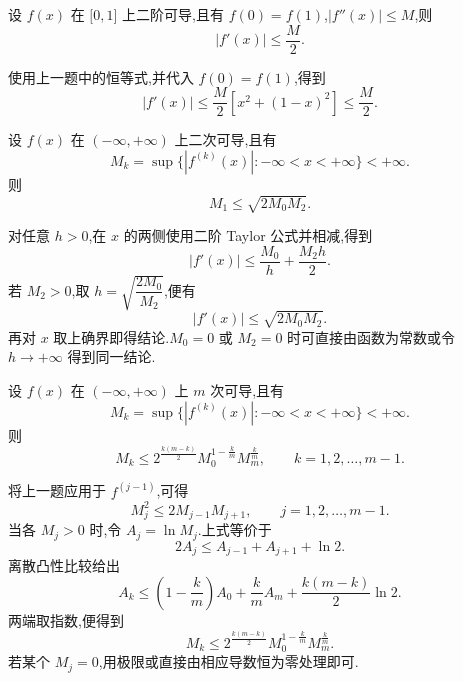 \begin{example}
    设 $f(x)$ 在 $\lbrack 0,1\rbrack$ 上二阶可导,且有 $f(0)=f(1)$,$|f''(x)|\leq M$,则
    \[
        |f'(x)|\leq\dfrac{M}{2}.
    \]
\end{example}
\exampleblank

\begin{solution}
    使用上一题中的恒等式,并代入 $f(0)=f(1)$,得到
    \[
        |f'(x)|
        \leq\dfrac{M}{2}\left[x^2+(1-x)^2\right]
        \leq\dfrac{M}{2}.
    \]
\end{solution}

\begin{example}[\markstar]
    设 $f(x)$ 在 $(-\infty,+\infty)$ 上二次可导,且有
    \[
        M_k=\sup\{|f^{(k)}(x)|:-\infty<x<+\infty\}<+\infty.
    \]
    则
    \[
        M_1\leq\sqrt{2M_0M_2}.
    \]
\end{example}
\exampleblank

\begin{solution}
    对任意 $h>0$,在 $x$ 的两侧使用二阶 Taylor 公式并相减,得到
    \[
        |f'(x)|\leq\dfrac{M_0}{h}+\dfrac{M_2h}{2}.
    \]
    若 $M_2>0$,取 $h=\sqrt{\dfrac{2M_0}{M_2}}$,便有
    \[
        |f'(x)|\leq\sqrt{2M_0M_2}.
    \]
    再对 $x$ 取上确界即得结论.$M_0=0$ 或 $M_2=0$ 时可直接由函数为常数或令 $h\to+\infty$ 得到同一结论.
\end{solution}

\begin{example}[\markstar]
    设 $f(x)$ 在 $(-\infty,+\infty)$ 上 $m$ 次可导,且有
    \[
        M_k=\sup\{|f^{(k)}(x)|:-\infty<x<+\infty\}<+\infty.
    \]
    则
    \[
        M_k\leq2^{\frac{k(m-k)}{2}}M_0^{1-\frac{k}{m}}M_m^{\frac{k}{m}},
        \qquad k=1,2,\ldots,m-1.
    \]
\end{example}
\exampleblank

\begin{solution}
    将上一题应用于 $f^{(j-1)}$,可得
    \[
        M_j^2\leq2M_{j-1}M_{j+1},
        \qquad j=1,2,\ldots,m-1.
    \]
    当各 $M_j>0$ 时,令 $A_j=\ln M_j$.上式等价于
    \[
        2A_j\leq A_{j-1}+A_{j+1}+\ln2.
    \]
    离散凸性比较给出
    \[
        A_k\leq\left(1-\dfrac{k}{m}\right)A_0
        +\dfrac{k}{m}A_m+\dfrac{k(m-k)}{2}\ln2.
    \]
    两端取指数,便得到
    \[
        M_k\leq2^{\frac{k(m-k)}{2}}
        M_0^{1-\frac{k}{m}}M_m^{\frac{k}{m}}.
    \]
    若某个 $M_j=0$,用极限或直接由相应导数恒为零处理即可.
\end{solution}




